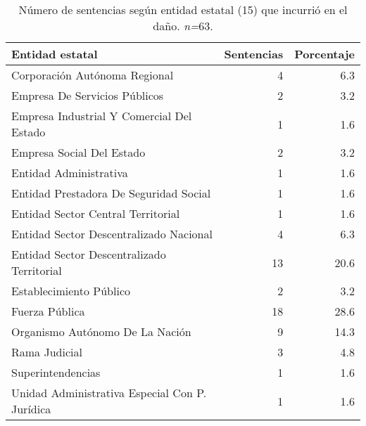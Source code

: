 \begin{table}[!htbp]
\centering
\caption{Número de sentencias según entidad estatal (15) que incurrió en el daño. \textit{n=}63.} 
\label{tab:entidad}
\begin{tabular}{lrr}
  \hline
Entidad estatal & Sentencias & Porcentaje \\ 
  \hline
Corporación Autónoma Regional &  4 & 6.3 \\ 
  Empresa De Servicios Públicos &  2 & 3.2 \\ 
  Empresa Industrial Y Comercial Del Estado &  1 & 1.6 \\ 
  Empresa Social Del Estado &  2 & 3.2 \\ 
  Entidad Administrativa &  1 & 1.6 \\ 
  Entidad Prestadora De Seguridad Social &  1 & 1.6 \\ 
  Entidad Sector Central Territorial &  1 & 1.6 \\ 
  Entidad Sector Descentralizado Nacional &  4 & 6.3 \\ 
  Entidad Sector Descentralizado Territorial & 13 & 20.6 \\ 
  Establecimiento Público &  2 & 3.2 \\ 
  Fuerza Pública & 18 & 28.6 \\ 
  Organismo Autónomo De La Nación &  9 & 14.3 \\ 
  Rama Judicial &  3 & 4.8 \\ 
  Superintendencias &  1 & 1.6 \\ 
  Unidad Administrativa Especial Con P. Jurídica &  1 & 1.6 \\ 
   \hline
\end{tabular}
\end{table}
